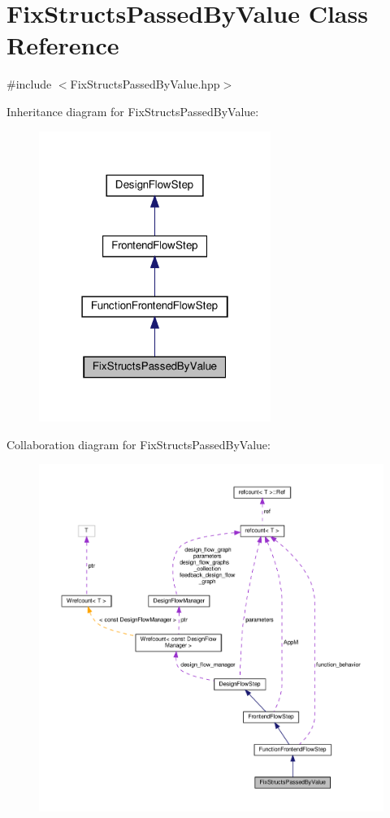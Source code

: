 \hypertarget{classFixStructsPassedByValue}{}\section{Fix\+Structs\+Passed\+By\+Value Class Reference}
\label{classFixStructsPassedByValue}


{\ttfamily \#include $<$Fix\+Structs\+Passed\+By\+Value.\+hpp$>$}



Inheritance diagram for Fix\+Structs\+Passed\+By\+Value\+:
\nopagebreak
\begin{figure}[H]
\begin{center}
\leavevmode
\includegraphics[width=214pt]{d3/df6/classFixStructsPassedByValue__inherit__graph}
\end{center}
\end{figure}


Collaboration diagram for Fix\+Structs\+Passed\+By\+Value\+:
\nopagebreak
\begin{figure}[H]
\begin{center}
\leavevmode
\includegraphics[width=350pt]{dd/d0a/classFixStructsPassedByValue__coll__graph}
\end{center}
\end{figure}
